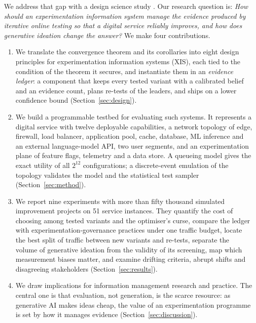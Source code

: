 \documentclass[preprint,12pt,authoryear]{elsarticle}
\theoremstyle{definition}
\begin{document}
We address that gap with a design science study \citep{hevner2004, gregor2013, peffers2007}. Our research question is: \emph{How should an experimentation information system manage the evidence produced by iterative online testing so that a digital service reliably improves, and how does generative ideation change the answer?} We make four contributions.

\begin{enumerate}[leftmargin=*,itemsep=2pt]
\item We translate the convergence theorem and its corollaries into eight design principles for experimentation information systems (XIS), each tied to the condition of the theorem it secures, and instantiate them in an \emph{evidence ledger}: a component that keeps every tested variant with a calibrated belief and an evidence count, plans re-tests of the leaders, and ships on a lower confidence bound (Section~\ref{sec:design}).
\item We build a programmable testbed for evaluating such systems. It represents a digital service with twelve deployable capabilities, a network topology of edge, firewall, load balancer, application pool, cache, database, ML inference and an external language-model API, two user segments, and an experimentation plane of feature flags, telemetry and a data store. A queueing model gives the exact utility of all $2^{12}$ configurations; a discrete-event emulation of the topology validates the model and the statistical test sampler (Section~\ref{sec:method}).
\item We report nine experiments with more than fifty thousand simulated improvement projects on 51 service instances. They quantify the cost of choosing among tested variants and the optimiser's curse, compare the ledger with experimentation-governance practices under one traffic budget, locate the best split of traffic between new variants and re-tests, separate the volume of generative ideation from the validity of its screening, map which measurement biases matter, and examine drifting criteria, abrupt shifts and disagreeing stakeholders (Section~\ref{sec:results}).
\item We draw implications for information management research and practice. The central one is that evaluation, not generation, is the scarce resource: as generative AI makes ideas cheap, the value of an experimentation programme is set by how it manages evidence (Section~\ref{sec:discussion}).
\end{enumerate}
\end{document}

